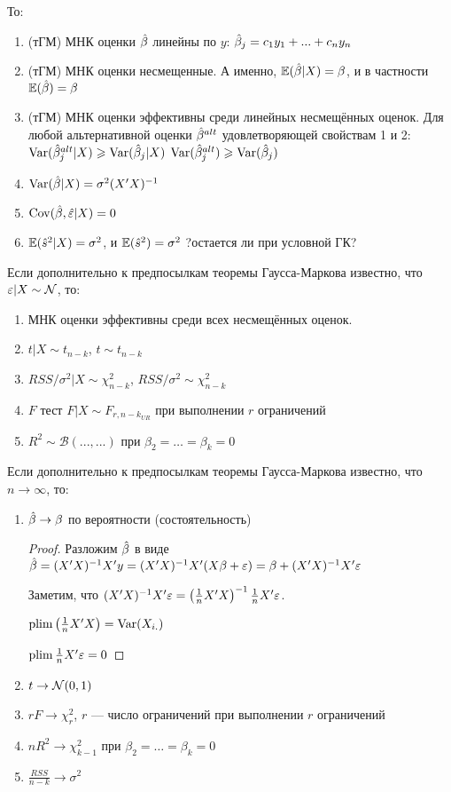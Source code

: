 \documentclass[12pt, a4paper]{article}
\theoremstyle{definition}
\begin{document}
То:

\begin{enumerate}
\item (тГМ) МНК оценки $\hat{\beta}$ линейны по $y$:
$\hat{\beta}_j=c_1 y_1 + ... + c_n y_n$
\item  (тГМ) МНК оценки несмещенные. А именно, $\operatorname{\mathbb{E}}(\hat{\beta} |X )=\beta$, и в частности $\operatorname{\mathbb{E}}(\hat{\beta})=\beta$
\item  (тГМ) МНК оценки эффективны среди линейных несмещённых оценок. Для любой альтернативной оценки $\hat{\beta}^{alt}$ удовлетворяющей свойствам 1 и 2:
$\operatorname{Var}(\hat{\beta}_j^{alt} | X)\geqslant \operatorname{Var}(\hat{\beta}_j | X)$
$\operatorname{Var}(\hat{\beta}_j^{alt} )\geqslant \operatorname{Var}(\hat{\beta}_j )$
\item  $\operatorname{Var}(\hat{\beta} | X )=\sigma^2 (X'X)^{-1}$
\item $\operatorname{Cov}(\hat{\beta},\hat{\varepsilon} | X)=0$
\item  $\operatorname{\mathbb{E}}(\hat{s}^2 |X ) = \sigma^2$, и $\operatorname{\mathbb{E}}(\hat{s}^2 ) = \sigma^2$ ?остается ли при условной ГК?
\end{enumerate}

Если дополнительно к предпосылкам теоремы Гаусса-Маркова известно, что $\varepsilon |X \sim \mathcal{N}$, то:

\begin{enumerate}
\item МНК оценки эффективны среди всех несмещённых оценок.
\item $t|X \sim t_{n-k}$, $t\sim t_{n-k}$
\item $RSS/\sigma^2 |X \sim \chi^2_{n-k}$, $RSS/\sigma^2 \sim \chi^2_{n-k}$
\item $F$ тест $F|X \sim F_{r, n-k_{UR}}$  при выполнении $r$ ограничений
\item $R^2 \sim \mathcal{B}(..., ...)$ при $\beta_2 = \ldots = \beta_k = 0$
\end{enumerate}

Если дополнительно к предпосылкам теоремы Гаусса-Маркова известно, что $n\to \infty$, то:

\begin{enumerate}
\item  $\hat{\beta} \to \beta$ по вероятности (состоятельность)

\begin{proof}
Разложим $\hat{\beta}$ в виде $\hat{\beta}=(X'X)^{-1}X'y=(X'X)^{-1}X'(X\beta+\varepsilon)=\beta+(X'X)^{-1}X'\varepsilon$

Заметим, что $(X'X)^{-1}X'\varepsilon=\left(\frac{1}{n}X'X\right)^{-1}\frac{1}{n}X'\varepsilon$.

$\operatorname*{plim} \left(\frac{1}{n}X'X\right)=\operatorname{Var}(X_{i.})$

$\operatorname*{plim} \frac{1}{n}X'\varepsilon=0$
\end{proof}

\item $t \to \mathcal{N}(0,1)$
\item $rF \to \chi^2_r$, $r$ — число ограничений при выполнении $r$ ограничений
\item $nR^2 \to \chi^2_{k-1}$ при $\beta_2 = \ldots = \beta_k = 0$
\item $\frac{RSS}{n-k} \to \sigma^2 $
\end{enumerate}
\end{document}
